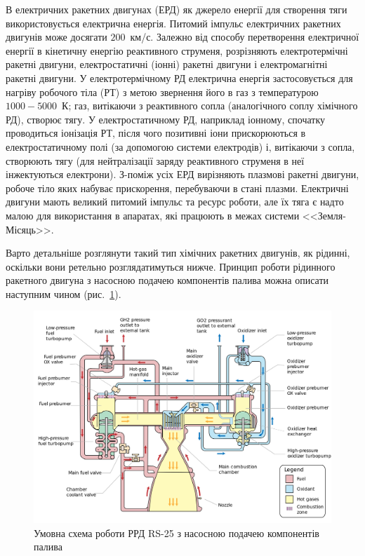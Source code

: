 В електричних ракетних двигунах (ЕРД) як джерело енергії для створення тяги використовується електрична енергія. Питомий імпульс електричних ракетних двигунів може досягати $200$~км/с. Залежно від способу перетворення електричної енергії в кінетичну енергію реактивного струменя, розрізняють електротермічні ракетні двигуни, електростатичні (іонні) ракетні двигуни і електромагнітні ракетні двигуни. У електротермічному РД електрична енергія застосовується для нагріву робочого тіла (РТ) з метою звернення його в газ з температурою $1000 - 5000$~К; газ, витікаючи з реактивного сопла (аналогічного соплу хімічного РД), створює тягу. У електростатичному РД, наприклад іонному, спочатку проводиться іонізація РТ, після чого позитивні іони прискорюються в електростатичному полі (за допомогою системи електродів) і, витікаючи з сопла, створюють тягу (для нейтралізації заряду реактивного струменя в неї інжектуються електрони). З-поміж усіх ЕРД вирізняють плазмові ракетні двигуни, робоче тіло яких набуває прискорення, перебуваючи в стані плазми. Електричні двигуни мають великий питомий імпульс та ресурс роботи, але їх тяга є надто малою для використання в апаратах, які працюють в межах системи <<Земля-Місяць>>.

Варто детальніше розглянути такий тип хімічних ракетних двигунів, як рідинні, оскільки вони ретельно розглядатимуться нижче.
Принцип роботи рідинного ракетного двигуна з насосною подачею компонентів палива можна описати наступним чином (рис.~\ref{fig:SSME}).

\begin{figure}
    \centering
    \includegraphics[width=0.6\textheight, angle=0,origin=c]{chapter_1/Ssme_schematic_(updated).svg.png}
    \caption{Умовна схема роботи РРД RS-25 з насосною подачею компонентів палива}
    \label{fig:SSME}
\end{figure}

